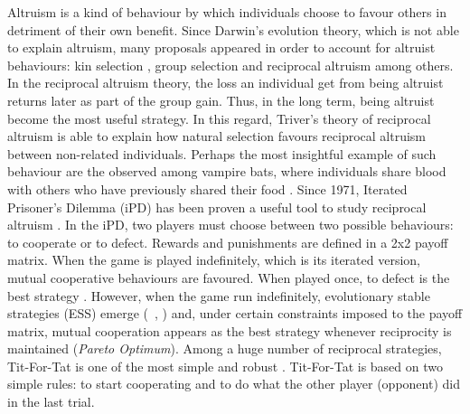 \documentclass[10pt,letterpaper]{article}
\begin{document}
Altruism is a kind of behaviour by which individuals choose to favour others in detriment of their own benefit. Since Darwin’s evolution theory, which is not able to explain altruism, many proposals appeared in order to account for altruist behaviours: kin selection \cite{smith1964group}, group selection and reciprocal altruism \cite{trivers1971evolution} among others.  In the reciprocal altruism theory, the loss an individual get from being altruist returns later as part of the group gain. Thus, in the long term, being altruist become the most useful strategy. In this regard, Triver's theory of reciprocal altruism is able to explain how natural selection favours reciprocal altruism between non-related individuals. Perhaps the most insightful example of such behaviour are the observed among vampire bats, where individuals share blood with others who have previously shared their food \cite{wilkinson1988reciprocal}.
Since 1971, Iterated Prisoner's Dilemma (iPD) has been proven a useful tool to study reciprocal altruism \cite{flood19832}. In the iPD, two players must choose between two possible behaviours: to cooperate or to defect. Rewards and punishments are defined in a 2x2 payoff matrix. When the game is played indefinitely, which is its iterated version, mutual cooperative behaviours are favoured. When played once,  to defect is the best strategy \cite{doebeli2005models}. However, when the game run indefinitely, evolutionary stable strategies (ESS) emerge (~\cite{von1944game}, \cite{nash1950equilibrium}) and, under certain constraints imposed to the payoff matrix, mutual cooperation appears as the best strategy whenever reciprocity is maintained (\textit{Pareto Optimum}). Among a huge number of reciprocal strategies, Tit-For-Tat is one of the most simple and robust \cite{hamilton1981evolution}. Tit-For-Tat is based on two simple rules: to start cooperating and to do what the other player (opponent) did in the last trial.
\end{document}

